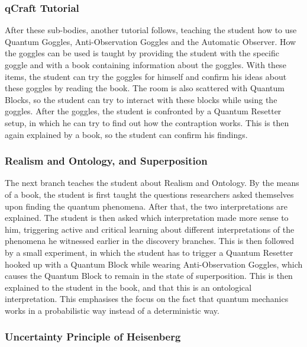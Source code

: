 \documentclass[11pt,twoside]{report} %
\begin{document}
\subsubsection{qCraft Tutorial}

After these sub-bodies, another tutorial follows, teaching the student how to use Quantum Goggles, Anti-Observation Goggles and the Automatic Observer. How the goggles can be used is taught by providing the student with the specific goggle and with a book containing information about the goggles. With these items, the student can try the goggles for himself and confirm his ideas about these goggles by reading the book. The room is also scattered with Quantum Blocks, so the student can try to interact with these blocks while using the goggles. After the goggles, the student is confronted by a Quantum Resetter setup, in which he can try to find out how the contraption works. This is then again explained by a book, so the student can confirm his findings.

\subsubsection{Realism and Ontology, and Superposition}

The next branch teaches the student about Realism and Ontology. By the means of a book, the student is first taught the questions researchers asked themselves upon finding the quantum phenomena. After that, the two interpretations are explained. The student is then asked which interpretation made more sense to him, triggering active and critical learning about different interpretations of the phenomena he witnessed earlier in the discovery branches. This is then followed by a small experiment, in which the student has to trigger a Quantum Resetter hooked up with a Quantum Block while wearing Anti-Observation Goggles, which causes the Quantum Block to remain in the state of superposition. This is then explained to the student in the book, and that this is an ontological interpretation. This emphasises the focus on the fact that quantum mechanics works in a probabilistic way instead of a deterministic way.

\subsubsection{Uncertainty Principle of Heisenberg}
\end{document}
